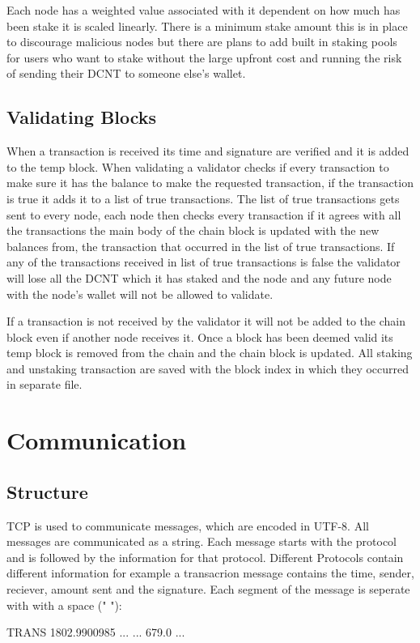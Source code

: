\documentclass[11pt]{extarticle}
\begin{document}
Each node has a weighted value associated with it dependent on how much has been stake it is scaled linearly. There is a minimum stake amount this is in place to discourage malicious nodes but there are plans to add built in staking pools for users who want to stake without the large upfront cost and running the risk of sending their DCNT to someone else's wallet.
\subsection{Validating Blocks}
When a transaction is received its time and signature are verified and it is added to the temp block. When validating a validator checks if every transaction to make sure it has the balance to make the requested transaction, if the transaction is true it adds it to a list of true transactions. The list of true transactions gets sent to every node, each node then checks every transaction if it agrees with all the transactions the main body of the chain block is updated with the new balances from, the transaction that occurred in the list of true transactions. If any of the transactions received in list of true transactions is false the validator will lose all the DCNT which it has staked and the node and any future node with the node's wallet will not be allowed to validate.

If a transaction is not received by the validator it will not be added to the chain block even if another node receives it. Once a block has been deemed valid its temp block is removed from the chain and the chain block is updated. All staking and unstaking transaction are saved with the block index in which they occurred in separate file.

\section{Communication}
\subsection{Structure}
TCP is used to communicate messages, which are encoded in UTF-8. All messages are communicated as a string. Each message starts with the protocol and is followed by the information for that protocol. Different Protocols contain different information for example a transacrion message contains the time, sender, reciever, amount sent and the signature. Each segment of the message is seperate with with a space (" "):

\begin{center}
TRANS \hspace{0.1cm} 1802.9900985 \hspace{0.1cm} ... \hspace{0.1cm} ... \hspace{0.1cm}  679.0 \hspace{0.1cm} ...
\end{center}
\end{document}
